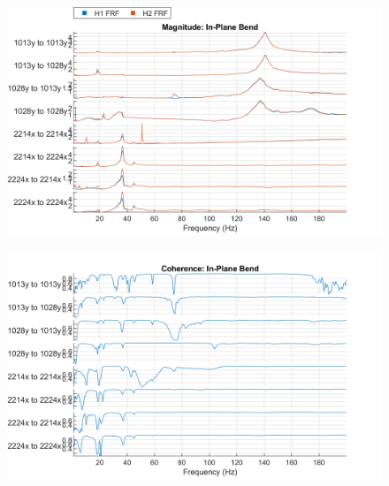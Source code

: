 \begin{figure}
    \centering
    \includegraphics{figs/GVT/mag_In-Plane Bend.png}    
    \label{fig:mag_inPlaneBend}
\end{figure}
\begin{figure}
    \centering
    \includegraphics{figs/GVT/coh_In-Plane Bend.png}
    \label{fig:coh_inPlaneBend}
\end{figure}

